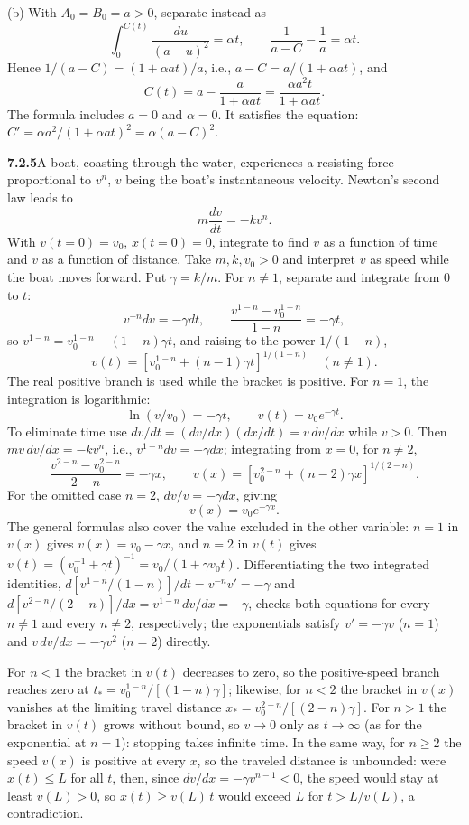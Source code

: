 (b) With $A_0=B_0=a>0$, separate instead as
\[
\int_0^{C(t)}\frac{du}{(a-u)^2}=\alpha t,
\qquad \frac1{a-C}-\frac1a=\alpha t.
\]
Hence $1/(a-C)=(1+\alpha at)/a$, i.e., $a-C=a/(1+\alpha at)$, and
\[
\boxed{C(t)=a-\frac a{1+\alpha at}=\frac{\alpha a^2t}{1+\alpha at}}.
\]
The formula includes $a=0$ and $\alpha=0$. It satisfies the equation:
$C'=\alpha a^2/(1+\alpha at)^2=\alpha(a-C)^2$.

\par\bigskip
\noindent\textbf{7.2.5}\quad A boat, coasting through the water, experiences a
resisting force proportional to $v^{n}$, $v$ being the boat's instantaneous
velocity. Newton's second law leads to
\[
m\frac{dv}{dt}=-kv^{n}.
\]
With $v(t=0)=v_{0}$, $x(t=0)=0$, integrate to find $v$ as a function of time
and $v$ as a function of distance.
\solution
Take $m,k,v_0>0$ and interpret $v$ as speed while the boat moves
forward. Put $\gamma=k/m$. For $n\ne1$, separate and integrate from $0$
to $t$:
\[
v^{-n}dv=-\gamma dt,\qquad
\frac{v^{1-n}-v_0^{1-n}}{1-n}=-\gamma t,
\]
so $v^{1-n}=v_0^{1-n}-(1-n)\gamma t$, and raising to the power $1/(1-n)$,
\[
\boxed{v(t)=\left[v_0^{1-n}+(n-1)\gamma t\right]^{1/(1-n)}}
\quad(n\ne1).
\]
The real positive branch is used while the bracket is positive. For
$n=1$, the integration is logarithmic:
\[
\ln(v/v_0)=-\gamma t,\qquad \boxed{v(t)=v_0e^{-\gamma t}}.
\]
To eliminate time use $dv/dt=(dv/dx)(dx/dt)=v\,dv/dx$ while $v>0$.
Then $mv\,dv/dx=-kv^n$, i.e., $v^{1-n}dv=-\gamma dx$; integrating from
$x=0$, for $n\ne2$,
\[
\frac{v^{2-n}-v_0^{2-n}}{2-n}=-\gamma x,
\qquad
\boxed{v(x)=\left[v_0^{2-n}+(n-2)\gamma x\right]^{1/(2-n)}}.
\]
For the omitted case $n=2$, $dv/v=-\gamma dx$, giving
\[
\boxed{v(x)=v_0e^{-\gamma x}}.
\]
The general formulas also cover the value excluded in the other
variable: $n=1$ in $v(x)$ gives $v(x)=v_0-\gamma x$, and $n=2$ in $v(t)$
gives $v(t)=(v_0^{-1}+\gamma t)^{-1}=v_0/(1+\gamma v_0t)$.
Differentiating the two integrated identities,
$d[v^{1-n}/(1-n)]/dt=v^{-n}v'=-\gamma$ and
$d[v^{2-n}/(2-n)]/dx=v^{1-n}\,dv/dx=-\gamma$, checks both equations
for every $n\ne1$ and every $n\ne2$, respectively; the exponentials
satisfy $v'=-\gamma v$ ($n=1$) and $v\,dv/dx=-\gamma v^2$ ($n=2$)
directly.

For $n<1$ the bracket in $v(t)$ decreases to zero, so the positive-speed
branch reaches zero at $t_*=v_0^{1-n}/[(1-n)\gamma]$; likewise, for $n<2$
the bracket in $v(x)$ vanishes at the limiting travel distance
$x_*=v_0^{2-n}/[(2-n)\gamma]$. For $n>1$ the bracket in $v(t)$ grows
without bound, so $v\to0$ only as $t\to\infty$ (as for the exponential
at $n=1$): stopping takes infinite time. In the same way, for $n\ge2$ the
speed $v(x)$ is positive at every $x$, so the traveled distance is
unbounded: were $x(t)\le L$ for all $t$, then, since
$dv/dx=-\gamma v^{n-1}<0$, the speed would stay at least $v(L)>0$, so
$x(t)\ge v(L)\,t$ would exceed $L$ for $t>L/v(L)$, a contradiction.

